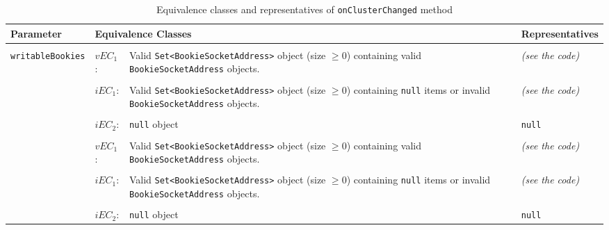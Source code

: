 \documentclass[sigconf]{acmart}
\begin{document}
\begin{table}[h!]
  \caption{Equivalence classes and representatives of \texttt{onClusterChanged} method}
  \centering
  \begin{tabular}{llp{7cm}p{7cm}}
  
    \toprule
    \textbf{Parameter} & \multicolumn{2}{|l|}{\textbf{Equivalence Classes}} & \textbf{Representatives} \\
    \midrule
    
    \\
	\multirow{7}{*}{\texttt{writableBookies}} & $vEC_1$: & Valid \texttt{Set<BookieSocketAddress>} object (size $\geqslant 0$) containing valid \texttt{BookieSocketAddress} objects. & \textit{(see the code)} \\    
    
    \\
    & $iEC_1$: & Valid \texttt{Set<BookieSocketAddress>} object (size $\geqslant 0$) containing \texttt{null} items or invalid \texttt{BookieSocketAddress} objects. & \textit{(see the code)} \\    
    
    \\
    & $iEC_2$: & \texttt{null} object & \texttt{null} \\    
    
    \hline
    
    \\
    \multirow{7}{*}{\texttt{readOnlyBookies}} & $vEC_1$: & Valid \texttt{Set<BookieSocketAddress>} object (size $\geqslant 0$) containing valid \texttt{BookieSocketAddress} objects. & \textit{(see the code)} \\    
   
     \\
    & $iEC_1$: & Valid \texttt{Set<BookieSocketAddress>} object (size $\geqslant 0$) containing \texttt{null} items or invalid \texttt{BookieSocketAddress} objects. & \textit{(see the code)} \\    
    
    \\
    & $iEC_2$: & \texttt{null} object & \texttt{null} \\    
    
    \bottomrule
  \end{tabular}
\end{table}
\end{document}
